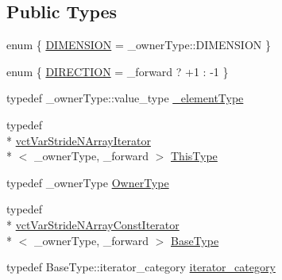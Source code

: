 \subsection*{Public Types}
\begin{DoxyCompactItemize}
\item 
enum \{ \hyperlink{classvct_var_stride_n_array_iterator_a982bcef37bef37c57993bcf62f572b53ada81b91fee86d82f21804a797bc37cdb}{D\-I\-M\-E\-N\-S\-I\-O\-N} = \-\_\-owner\-Type\-:\-:D\-I\-M\-E\-N\-S\-I\-O\-N
 \}
\item 
enum \{ \hyperlink{classvct_var_stride_n_array_iterator_a9fdab4cf642b11877eaf134c251fb782a17cb8d5ba62f2e50e8e6a2e4353434d5}{D\-I\-R\-E\-C\-T\-I\-O\-N} = \-\_\-forward ? +1 \-: -\/1
 \}
\item 
typedef \-\_\-owner\-Type\-::value\-\_\-type \hyperlink{classvct_var_stride_n_array_iterator_ad3f815ae11188c45c85071e5cbd7ee8d}{\-\_\-element\-Type}
\item 
typedef \\*
\hyperlink{classvct_var_stride_n_array_iterator}{vct\-Var\-Stride\-N\-Array\-Iterator}\\*
$<$ \-\_\-owner\-Type, \-\_\-forward $>$ \hyperlink{classvct_var_stride_n_array_iterator_ae02517903d76b5ea390357e329d7d234}{This\-Type}
\item 
typedef \-\_\-owner\-Type \hyperlink{classvct_var_stride_n_array_iterator_ace0aaa36ae04ab580bdc4b41540f5da8}{Owner\-Type}
\item 
typedef \\*
\hyperlink{classvct_var_stride_n_array_const_iterator}{vct\-Var\-Stride\-N\-Array\-Const\-Iterator}\\*
$<$ \-\_\-owner\-Type, \-\_\-forward $>$ \hyperlink{classvct_var_stride_n_array_iterator_a23f53d3764feb53f61a458e5f28a78ad}{Base\-Type}
\item 
typedef Base\-Type\-::iterator\-\_\-category \hyperlink{classvct_var_stride_n_array_iterator_a914738ffb87fa950256c5fc39d4cf855}{iterator\-\_\-category}
\end{DoxyCompactItemize}
